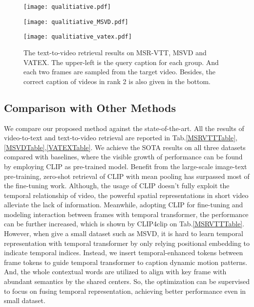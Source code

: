 \documentclass[final]{cvpr}
\begin{document}
\begin{figure*}
    \begin{center}
        \texttt{[image: qualitiative.pdf]}
    \end{center}
    \vspace{-0.7cm}
    \begin{center}
        \texttt{[image: qualitiative\_MSVD.pdf]}
    \end{center}
    \vspace{-0.7cm}
    \begin{center}
        \texttt{[image: qualitiative\_vatex.pdf]}
    \end{center}
    \vspace{-0.6cm}
    \caption{ 
The text-to-video retrieval results on MSR-VTT, MSVD and VATEX. The upper-left is the query caption for each group. And each two frames are sampled from the target video. Besides, the correct caption of videos in rank 2 is also given in the bottom.
    }
    \label{vis}        
\end{figure*}

\subsection{Comparison with Other Methods}
We compare our proposed method against the state-of-the-art. All the results of video-to-text and text-to-video retrieval are reported in Tab.\ref{MSRVTTTable},\ref{MSVDTable},\ref{VATEXTable}. We achieve the SOTA results on all three datasets compared with baselines, where the visible growth of performance can be found by employing CLIP \cite{portillo2021straightforward} as pre-trained model. Benefit from the large-scale image-text pre-training,  zero-shot retrieval of CLIP with mean pooling has surpassed most of the fine-tuning work. Although, the usage of CLIP doesn't fully exploit the temporal relationship of video, the powerful spatial representations in short video alleviate the lack of information. Meanwhile, adopting CLIP for fine-tuning and modeling interaction between frames with temporal transformer, the performance can be further increased, which is shown by CLIP4clip \cite{luo2021clip4clip} on Tab.\ref{MSRVTTTable}. 
However, when give a small dataset such as MSVD, it is hard to learn temporal representation with temporal transformer by only relying positional embedding to indicate temporal indices. Instead, we insert temporal-enhanced tokens between frame tokens to guide temporal transformer to caption dynamic motion patterns.
And, the whole contextual words are utilized to align with key frame with abundant semantics by the shared centers. So, the optimization can be supervised to focus on fusing temporal representation, achieving better performance even in small dataset. 
\end{document}
